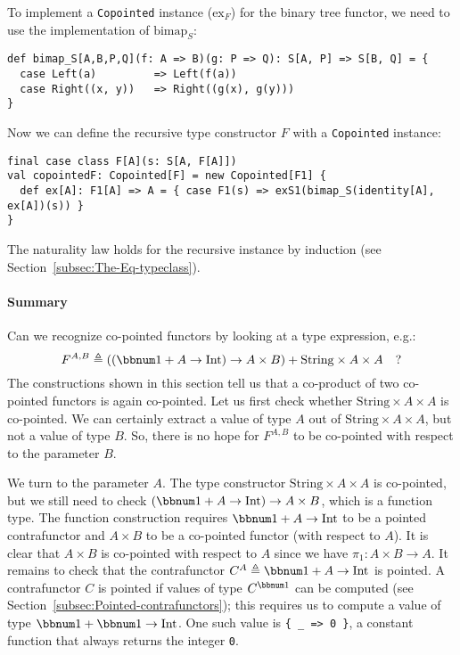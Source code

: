 To implement a \lstinline!Copointed! instance ($\text{ex}_{F}$)
for the binary tree functor, we need to use the implementation of
$\text{bimap}_{S}$:
\begin{lstlisting}
def bimap_S[A,B,P,Q](f: A => B)(g: P => Q): S[A, P] => S[B, Q] = {
  case Left(a)         => Left(f(a))
  case Right((x, y))   => Right((g(x), g(y)))
}
\end{lstlisting}
Now we can define the recursive type constructor $F$ with a \lstinline!Copointed!
instance:
\begin{lstlisting}
final case class F[A](s: S[A, F[A]])
val copointedF: Copointed[F] = new Copointed[F1] {
  def ex[A]: F1[A] => A = { case F1(s) => exS1(bimap_S(identity[A], ex[A])(s)) }
}
\end{lstlisting}
The naturality law holds for the recursive instance by induction (see
Section~\ref{subsec:The-Eq-typeclass}).

\paragraph{Summary}

Can we recognize co-pointed functors by looking at a type expression,
e.g.:
\[
F^{A,B}\triangleq\left(\left(\bbnum 1+A\rightarrow\text{Int}\right)\rightarrow A\times B\right)+\text{String}\times A\times A\quad?
\]
The constructions shown in this section tell us that a co-product
of two co-pointed functors is again co-pointed. Let us first check
whether $\text{String}\times A\times A$ is co-pointed. We can certainly
extract a value of type $A$ out of $\text{String}\times A\times A$,
but not a value of type $B$. So, there is no hope for $F^{A,B}$
to be co-pointed with respect to the parameter $B$.

We turn to the parameter $A$. The type constructor $\text{String}\times A\times A$
is co-pointed, but we still need to check $\left(\bbnum 1+A\rightarrow\text{Int}\right)\rightarrow A\times B$,
which is a function type. The function construction requires $\bbnum 1+A\rightarrow\text{Int}$
to be a pointed contrafunctor and $A\times B$ to be a co-pointed
functor (with respect to $A$). It is clear that $A\times B$ is co-pointed
with respect to $A$ since we have $\pi_{1}:A\times B\rightarrow A$.
It remains to check that the contrafunctor $C^{A}\triangleq\bbnum 1+A\rightarrow\text{Int}$
is pointed. A contrafunctor $C$ is pointed if values of type $C^{\bbnum 1}$
can be computed (see Section~\ref{subsec:Pointed-contrafunctors});
this requires us to compute a value of type $\bbnum 1+\bbnum 1\rightarrow\text{Int}$.
One such value is \lstinline!{ _ => 0 }!, a constant function that
always returns the integer \lstinline!0!. 

